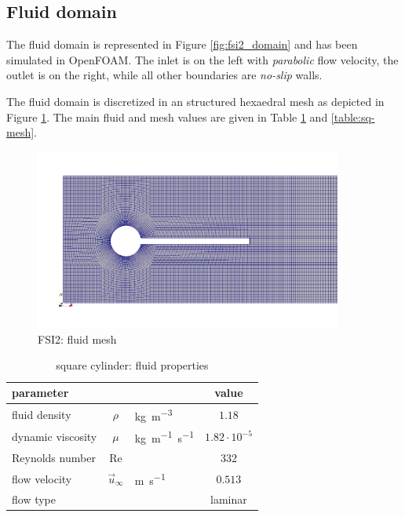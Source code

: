 \subsection{Fluid domain}

The fluid domain is represented in Figure \ref{fig:fsi2_domain} and has been simulated in OpenFOAM. The inlet is on the left with \textit{parabolic} flow velocity, the outlet is on the right, while all other boundaries are \textit{no-slip} walls.

The fluid domain is discretized in an structured hexaedral mesh as depicted in Figure \ref{fig:fsi2_mesh}. The main fluid and mesh values are given in Table \ref{table:sq-fluid} and \ref{table:sq-mesh}. 

\begin{figure}[htbp!]
	\centering
	\includegraphics[width=0.9\textwidth]{images/FSI2/FSI2-mesh.png}
	\caption{FSI2: fluid mesh}
	\label{fig:fsi2_mesh}
\end{figure}





















\begin{table}[!htb]
	\begin{center}
		\begin{tabular}{ l c l | c } 
			parameter & & & value  \\ 
			\hline
			fluid density  & $\rho$ & \si{kg.m^{-3}} & $1.18$   \\
			dynamic viscosity & $\mu$& \si{kg.m^{-1}.s^{-1}} & $1.82 \cdot 10^{-5}$  \\
			Reynolds number & Re &  & $332$ \\
			flow velocity & $\vec{u}_{\infty}$ & \si{m.s^{-1}} & $0.513$ \\
			flow type & & & laminar \\
		\end{tabular}
	\end{center}
	\caption{square cylinder: fluid properties}
	\label{table:sq-fluid}
\end{table}



